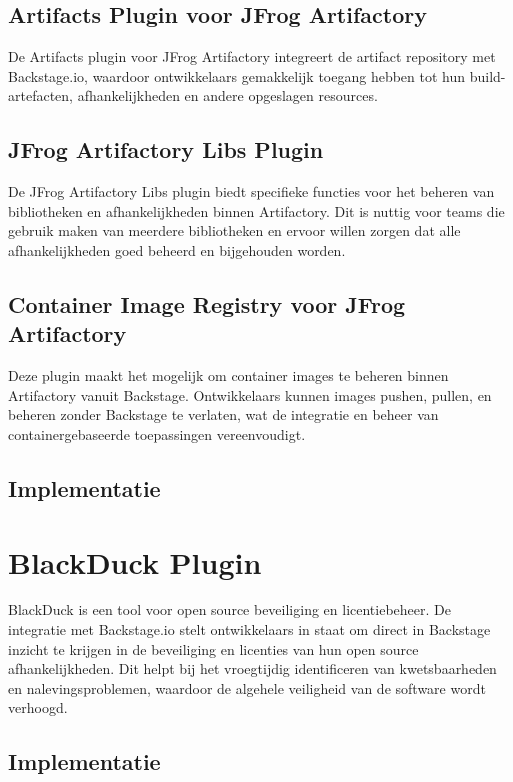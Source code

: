 \subsection{Artifacts Plugin voor JFrog Artifactory}

De Artifacts plugin voor JFrog Artifactory integreert de artifact repository met Backstage.io, waardoor ontwikkelaars gemakkelijk toegang hebben tot hun build-artefacten, afhankelijkheden en andere opgeslagen resources.

\subsection{JFrog Artifactory Libs Plugin}

De JFrog Artifactory Libs plugin biedt specifieke functies voor het beheren van bibliotheken en afhankelijkheden binnen Artifactory. Dit is nuttig voor teams die gebruik maken van meerdere bibliotheken en ervoor willen zorgen dat alle afhankelijkheden goed beheerd en bijgehouden worden.

\subsection{Container Image Registry voor JFrog Artifactory}

Deze plugin maakt het mogelijk om container images te beheren binnen Artifactory vanuit Backstage. Ontwikkelaars kunnen images pushen, pullen, en beheren zonder Backstage te verlaten, wat de integratie en beheer van containergebaseerde toepassingen vereenvoudigt.

\subsection{Implementatie}


\section{BlackDuck Plugin}

BlackDuck is een tool voor open source beveiliging en licentiebeheer. De integratie met Backstage.io stelt ontwikkelaars in staat om direct in Backstage inzicht te krijgen in de beveiliging en licenties van hun open source afhankelijkheden. Dit helpt bij het vroegtijdig identificeren van kwetsbaarheden en nalevingsproblemen, waardoor de algehele veiligheid van de software wordt verhoogd.

\subsection{Implementatie}

